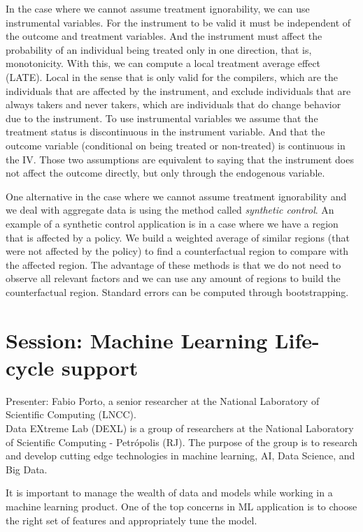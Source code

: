\documentclass[9pt,a4paper]{article}
\begin{document}
In the case where we cannot assume treatment ignorability, we can use instrumental variables. 
For the instrument to be valid it must be independent of the outcome and treatment variables.
And the instrument must affect the probability of an individual being treated only in one direction, that is, monotonicity.
With this, we can compute a local treatment average effect (LATE). 
Local in the sense that is only valid for the compilers, which are the individuals that are affected by the instrument, and exclude individuals that are always takers and never takers, which are individuals that do change behavior due to the instrument.
To use instrumental variables we assume that the treatment status is discontinuous in the instrument variable. 
And that the outcome variable (conditional on being treated or non-treated) is continuous in the IV. 
Those two assumptions are equivalent to saying that the instrument does not affect the outcome directly, but only through the endogenous variable.

One alternative in the case where we cannot assume treatment ignorability and we deal with aggregate data is using the method called \textit{synthetic control}. An example of a synthetic control application is in a case where we have a region that is affected by a policy. We build a weighted average of similar regions (that were not affected by the policy) to find a counterfactual region to compare with the affected region. The advantage of these methods is that we do not need to observe all relevant factors and we can use any amount of regions to build the counterfactual region. 
Standard errors can be computed through bootstrapping.

\section*{Session: Machine Learning Life-cycle support}

Presenter: Fabio Porto, a senior researcher at the National Laboratory of Scientific Computing (LNCC).\\

Data EXtreme Lab (DEXL) is a group of researchers at the National Laboratory of Scientific Computing - Petrópolis (RJ).
The purpose of the group is to research and develop cutting edge technologies in machine learning, AI, Data Science, and Big Data.

It is important to manage the wealth of data and models while working in a machine learning product. 
One of the top concerns in ML application is to choose the right set of features and appropriately tune the model. 
\end{document}
